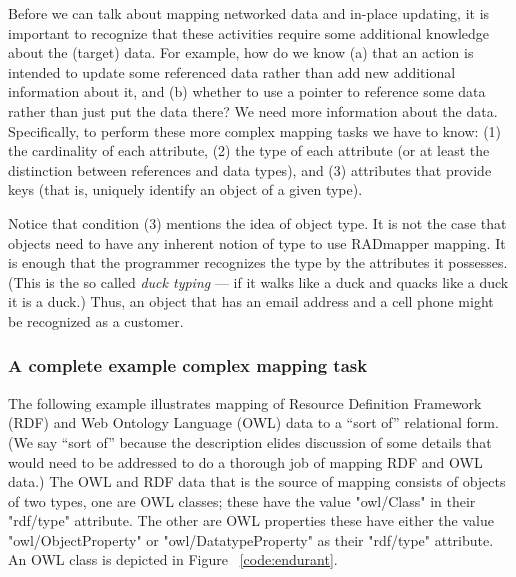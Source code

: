 \documentclass[9pt,letterpaper]{article}
\newcommand{\stt}[1]{\begin{footnotesize}\texttt{#1}\end{footnotesize}}
\begin{document}
Before we can talk about mapping networked data and in-place updating, it is important to recognize that these activities require
some additional knowledge about the (target) data.
For example, how do we know
(a) that an action is intended to update some referenced data rather than add new additional information about it, and
(b) whether to use a pointer to reference some data rather than just put the data there?
We need more information about the data.
Specifically, to perform these more complex mapping tasks we have to know:
(1) the cardinality of each attribute,
(2) the type of each attribute (or at least the distinction between references and data types), and
(3) attributes that provide keys (that is, uniquely identify an object of a given type).

Notice that condition (3) mentions the idea of object type.
It is not the case that objects need to have any inherent notion of type to use RADmapper mapping.
It is enough that the programmer recognizes the type by the attributes it possesses.
(This is the so called \textit{duck typing} --- if it walks like a duck and quacks like a duck it is a duck.)
Thus, an object that has an email address and a cell phone might be recognized as a customer.

\subsubsection{A complete example complex mapping task}

The following example illustrates mapping of Resource Definition Framework (RDF) and Web Ontology Language (OWL) data to
a ``sort of'' relational form. (We say ``sort of'' because the description elides discussion of some details that would need
to be addressed to do a thorough job of mapping RDF and OWL data.)
The OWL and RDF data that is the source of mapping consists of objects of two types, one are OWL classes;
these have the value  "owl/Class" in their "rdf/type" attribute.
The other are OWL properties these have either the value "owl/ObjectProperty" or "owl/DatatypeProperty" as
their "rdf/type" attribute. An OWL class is depicted in Figure ~\ref{code:endurant}.
\end{document}
